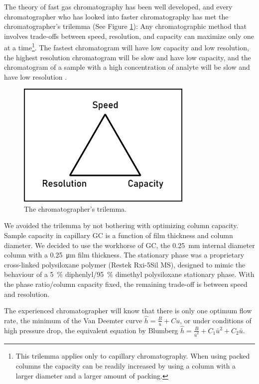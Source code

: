 The theory of fast gas chromatography has been well developed, and every chromatographer who has looked into faster
chromatography has met the chromatographer's trilemma (See Figure
\ref{fig:trilemma}): Any chromatographic method that involves trade-offs between
speed, resolution, and capacity can maximize only one at a time\footnote{This
trilemma applies only to capillary chromatography. When using packed columns the capacity
can be readily increased by using a column with a larger diameter and a larger
amount of packing.}. The fastest chromatogram will have low capacity and low
resolution, the highest resolution chromatogram will be slow and have low
capacity, and the chromatogram of a sample with a high concentration of analyte
will be slow and have low resolution \autocite{Klee2002}.

\begin{figure}
\centering
\includegraphics[width=0.75\textwidth]{Figures/Triangle.pdf}
\decoRule
\caption[Schematic diagram of a the chromatograher's trilemma.]{The chromatographer's trilemma.}
\label{fig:trilemma}
\end{figure}

We avoided the trilemma by not bothering with optimizing column capacity. Sample
capacity in capillary GC is a function of film thickness and column diameter. We
decided to use the workhorse of GC, the \SI{0.25}{\milli\metre} internal
diameter column with a \SI{0.25}{\micro\metre} film thickness. The stationary
phase was a proprietary cross-linked polysiloxane polymer (Restek
Rxi\textregistered{}-5Sil MS), designed to mimic the behaviour of a
\SI{5}{\percent} diphenlyl/\SI{95}{\percent} dimethyl polysiloxane stationary
phase. With the phase ratio/column capacity fixed, the remaining trade-off is
between speed and resolution.

The experienced chromatographer will know that there is only one optimum flow
rate, the minimum of the Van Deemter curve \(\hat{h}=\frac{B}{u}+{C}{u}\), or under
conditions of high pressure drop, the equivalent equation by Blumberg
\autocite{Blumberg1997} \(\hat{h}=\frac{B}{\bar{u}^2} + C_1\bar{u}^2 +
C_2\bar{u}\).


